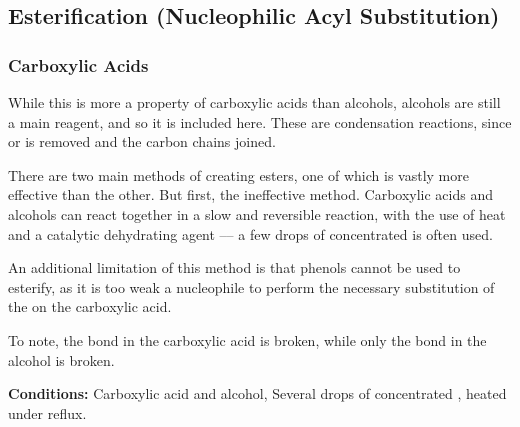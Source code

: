 
		\subsection{Esterification (Nucleophilic Acyl Substitution)}

			\subsubsection{Carboxylic Acids}

				While this is more a property of carboxylic acids than alcohols, alcohols are still a main reagent, and so it is included here.
				These are condensation reactions, since  or  is removed and the carbon chains joined.

				There are two main methods of creating esters, one of which is vastly more effective than the other. But first, the ineffective
				method. Carboxylic acids and alcohols can react together in a slow and reversible reaction, with the use of heat and a
				catalytic dehydrating agent –– a few drops of concentrated  is often used.

				An additional limitation of this method is that phenols cannot be used to esterify, as it is too weak a nucleophile to
				perform the necessary substitution of the  on the carboxylic acid.

				To note, the  bond in the carboxylic acid is broken, while only the  bond in the alcohol is broken.

				\vspace{1.5em}
				\vbox{\textbf{Conditions:}	\tabto{35mm}Carboxylic acid and alcohol,
											\tabto{35mm}Several drops of concentrated , heated under reflux.}


